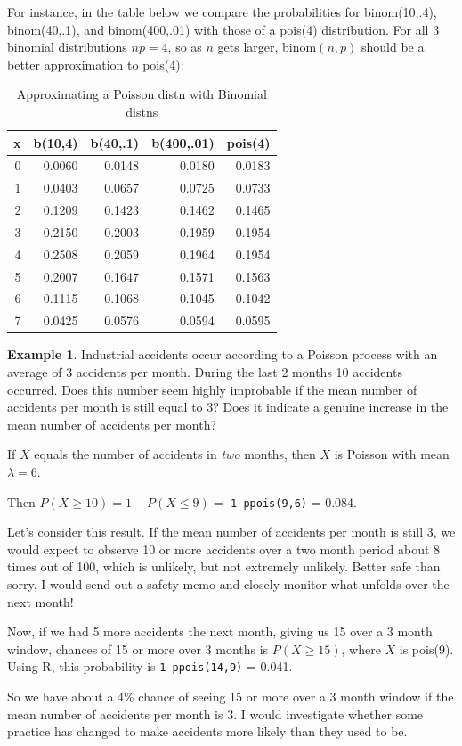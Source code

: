 \documentclass[
]{book}
\theoremstyle{definition}
\theoremstyle{definition}
\newtheorem{example}{Example}[chapter]
\theoremstyle{definition}
\theoremstyle{definition}
\theoremstyle{remark}
\begin{document}
For instance, in the table below we compare the probabilities for binom(10,.4), binom(40,.1), and binom(400,.01) with those of a pois(4) distribution. For all 3 binomial distributions \(np = 4\), so as \(n\) gets larger, binom\((n,p)\) should be a better approximation to pois(4):

\begin{table}
\centering
\caption{\label{tab:plot-pois-binom}Approximating a Poisson distn with Binomial distns}
\centering
\begin{tabular}[t]{r|r|r|r|r}
\hline
x & b(10,4) & b(40,.1) & b(400,.01) & pois(4)\\
\hline
0 & 0.0060 & 0.0148 & 0.0180 & 0.0183\\
\hline
1 & 0.0403 & 0.0657 & 0.0725 & 0.0733\\
\hline
2 & 0.1209 & 0.1423 & 0.1462 & 0.1465\\
\hline
3 & 0.2150 & 0.2003 & 0.1959 & 0.1954\\
\hline
4 & 0.2508 & 0.2059 & 0.1964 & 0.1954\\
\hline
5 & 0.2007 & 0.1647 & 0.1571 & 0.1563\\
\hline
6 & 0.1115 & 0.1068 & 0.1045 & 0.1042\\
\hline
7 & 0.0425 & 0.0576 & 0.0594 & 0.0595\\
\hline
\end{tabular}
\end{table}

\begin{example}
\protect\hypertarget{exm:pois-process}{}\label{exm:pois-process}Industrial accidents occur according to a Poisson process with an average of 3 accidents per month. During the last 2 months 10 accidents occurred. Does this number seem highly improbable if the mean number of accidents per month is still equal to 3? Does it indicate a genuine increase in the mean number of accidents per month?

If \(X\) equals the number of accidents in \emph{two} months, then \(X\) is Poisson with mean \(\lambda = 6\).

Then \(P(X \geq 10) = 1 - P(X \leq 9) =\) \texttt{1-ppois(9,6)} = 0.084.

Let's consider this result. If the mean number of accidents per month is still 3, we would expect to observe 10 or more accidents over a two month period about 8 times out of 100, which is unlikely, but not extremely unlikely. Better safe than sorry, I would send out a safety memo and closely monitor what unfolds over the next month!

Now, if we had 5 more accidents the next month, giving us 15 over a 3 month window, chances of 15 or more over 3 months is \(P(X \geq 15)\), where \(X\) is pois(9). Using R, this probability is \texttt{1-ppois(14,9)} = 0.041.

So we have about a 4\% chance of seeing 15 or more over a 3 month window if the mean number of accidents per month is 3. I would investigate whether some practice has changed to make accidents more likely than they used to be.
\end{example}
\end{document}
